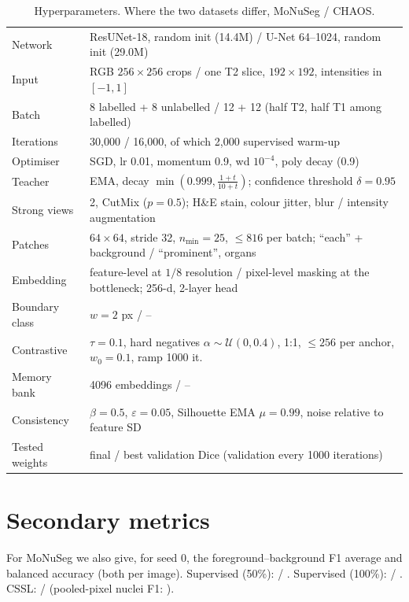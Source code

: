 \documentclass[11pt]{article}
\begin{document}
\begin{table}[H]
  \centering
  \caption{Hyperparameters. Where the two datasets differ, MoNuSeg / CHAOS.}
  \small
  \footnotesize
  \begin{tabular}{ll}
    \toprule
    Network & ResUNet-18, random init (14.4M) / U-Net 64--1024, random init (29.0M) \\
    Input & RGB $256\times256$ crops / one T2 slice, $192\times192$, intensities in $[-1,1]$ \\
    Batch & 8 labelled + 8 unlabelled / 12 + 12 (half T2, half T1 among labelled) \\
    Iterations & 30{,}000 / 16{,}000, of which 2{,}000 supervised warm-up \\
    Optimiser & SGD, lr 0.01, momentum 0.9, wd $10^{-4}$, poly decay (0.9) \\
    Teacher & EMA, decay $\min(0.999,\frac{1+t}{10+t})$; confidence threshold $\delta=0.95$ \\
    Strong views & 2, CutMix ($p=0.5$); H\&E stain, colour jitter, blur / intensity augmentation \\
    Patches & $64\times64$, stride 32, $n_{\min}=25$, $\le816$ per batch; ``each'' + background / ``prominent'', organs \\
    Embedding & feature-level at $1/8$ resolution / pixel-level masking at the bottleneck; 256-d, 2-layer head \\
    Boundary class & $w=2$ px / -- \\
    Contrastive & $\tau=0.1$, hard negatives $\alpha\sim\mathcal{U}(0,0.4)$, 1:1, $\le256$ per anchor, $w_0=0.1$, ramp 1000 it. \\
    Memory bank & 4096 embeddings / -- \\
    Consistency & $\beta=0.5$, $\varepsilon=0.05$, Silhouette EMA $\mu=0.99$, noise relative to feature SD \\
    Tested weights & final / best validation Dice (validation every 1000 iterations) \\
    \bottomrule
  \end{tabular}
\end{table}

\section{Secondary metrics}
\label{app:secondary}

For MoNuSeg we also give, for seed 0, the foreground--background F1 average and balanced accuracy (both per image). Supervised (50\%): \nMsupFiftyFgbg{} / \nMsupFiftyBacc. Supervised (100\%): \nMsupHundredFgbg{} / \nMsupHundredBacc.\ifhavesecondary{} CSSL: \nMcsslFgbg{} / \nMcsslBacc{} (pooled-pixel nuclei F1: \nMcsslPooled).\fi{}
\end{document}
